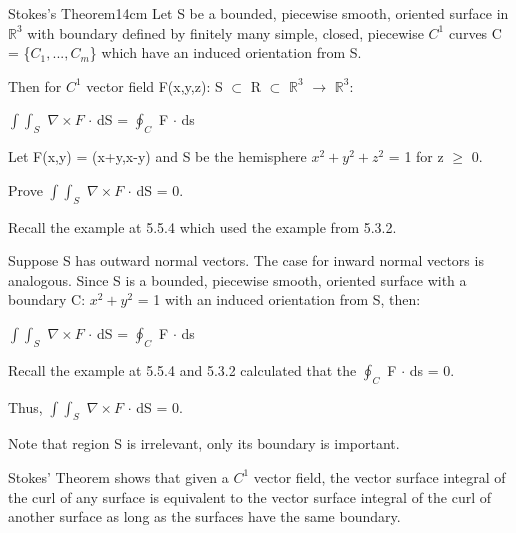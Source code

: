     \begin{wtheorem}{Stokes's Theorem}{14cm}
        Let S be a bounded, piecewise smooth, oriented surface in $\mathbb{R}^3$
        with boundary defined by finitely many simple, closed, piecewise $C^1$
        curves C = \{$C_1,...,C_m$\} which have an induced orientation from S.

        Then for $C^1$ vector field F(x,y,z): S $\subset$ R $\subset$
        $\mathbb{R}^3$ $\rightarrow$ $\mathbb{R}^3$:

        \hspace{0.5cm}
        $\int \int_S$ $\nabla \times F$ $\cdot$ dS
        = $\oint_C$ F $\cdot$ ds
    \end{wtheorem}

    \vspace{0.5cm}



    \begin{example}
        Let F(x,y) = (x+y,x-y)
        and S be the hemisphere $x^2+y^2+z^2$ = 1 for z $\geq$ 0.

        Prove $\int \int_S$ $\nabla \times F$ $\cdot$ dS = 0.

        Recall the example at 5.5.4 which used the example from 5.3.2.
    \end{example}

    \begin{tbox}
        Suppose S has outward normal vectors. The case for inward normal vectors
        is analogous.
        Since S is a bounded, piecewise smooth, oriented surface with a
        boundary C: $x^2+y^2$ = 1 with an induced orientation from S, then:

        \hspace{0.5cm}
        $\int \int_S$ $\nabla \times F$ $\cdot$ dS
        = $\oint_C$ F $\cdot$ ds

        Recall the example at 5.5.4 and 5.3.2
        calculated that the $\oint_C$ F $\cdot$ ds = 0.

        Thus, $\int \int_S$ $\nabla \times F$ $\cdot$ dS = 0.

        Note that region S is irrelevant, only
        its boundary is important.

        Stokes' Theorem shows that given a $C^1$ vector field,
        the vector surface integral of the curl of any surface
        is equivalent to the vector surface integral of the curl
        of another surface as long as the surfaces have the same boundary.
    \end{tbox}

